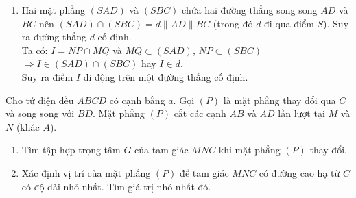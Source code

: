 \begin{bt}
{\begin{enumerate}
			Vậy diện tích hình thang $MNPQ$ vuông tại $M$ và $Q$ là: $$S_{MNPQ}=\dfrac{(MN+PQ).MQ}{2}=\dfrac{(a+a-x).2x}{2}=(2a-x)x.$$
			\item Hai mặt phẳng $(SAD)$ và $(SBC)$ chứa hai đường thẳng song song $AD$ và $BC$ nên $(SAD)\cap (SBC)=d\parallel AD \parallel BC$ (trong đó $d$ đi qua điểm $S$). Suy ra đường thẳng $d$ cố định.\\
			Ta có: $I=NP \cap MQ$ và $MQ \subset (SAD)$, $NP \subset (SBC)$ $\Rightarrow I \in (SAD) \cap (SBC)$ hay $I \in d$.\\
			Suy ra điểm $I$ di động trên một đường thẳng cố định.
		\end{enumerate}
	}
\end{bt}
\begin{bt}%
	Cho tứ diện đều $ABCD$ có cạnh bằng $a$. Gọi $(P)$ là mặt phẳng thay đổi qua $C$ và song song với $BD$. Mặt phẳng $(P)$ cắt các cạnh $AB$ và $AD$ lần lượt tại $M$ và $N$ (khác $A$).
	\begin{enumerate}
		\item Tìm tập hợp trọng tâm $G$ của tam giác $MNC$ khi mặt phẳng $(P)$ thay đổi.
		\item Xác định vị trí của mặt phẳng $(P)$ để tam giác $MNC$ có đường cao hạ từ $C$ có độ dài nhỏ nhất. Tìm giá trị nhỏ nhất đó.
	\end{enumerate}
\end{bt}
